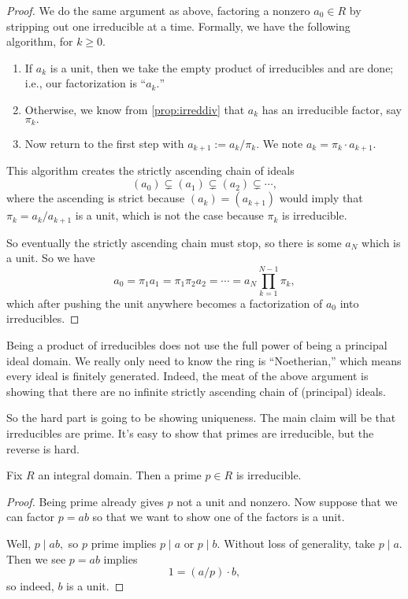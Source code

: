 \begin{proof}
    We do the same argument as above, factoring a nonzero $a_0\in R$ by stripping out one irreducible at a time. Formally, we have the following algorithm, for $k\ge0.$
    \begin{enumerate}
        \item If $a_k$ is a unit, then we take the empty product of irreducibles and are done; i.e., our factorization is ``$a_k.$''
        \item Otherwise, we know from \autoref{prop:irreddiv} that $a_k$ has an irreducible factor, say $\pi_k.$
        \item Now return to the first step with $a_{k+1}:=a_k/\pi_k.$ We note $a_k=\pi_k\cdot a_{k+1}.$
    \end{enumerate}
    This algorithm creates the strictly ascending chain of ideals
    \[(a_0)\subsetneq(a_1)\subsetneq(a_2)\subsetneq\cdots,\]
    where the ascending is strict because $(a_k)=(a_{k+1})$ would imply that $\pi_k=a_k/a_{k+1}$ is a unit, which is not the case because $\pi_k$ is irreducible.

    So eventually the strictly ascending chain must stop, so there is some $a_N$ which is a unit. So we have
    \[a_0=\pi_1a_1=\pi_1\pi_2a_2=\cdots=a_N\prod_{k=1}^{N-1}\pi_k,\]
    which after pushing the unit anywhere becomes a factorization of $a_0$ into irreducibles.
\end{proof}
\begin{remark}
    Being a product of irreducibles does not use the full power of being a principal ideal domain. We really only need to know the ring is ``Noetherian,'' which means every ideal is finitely generated. Indeed, the meat of the above argument is showing that there are no infinite strictly ascending chain of (principal) ideals.
\end{remark}
So the hard part is going to be showing uniqueness. The main claim will be that irreducibles are prime. It's easy to show that primes are irreducible, but the reverse is hard.
\begin{lemma}
    Fix $R$ an integral domain. Then a prime $p\in R$ is irreducible.
\end{lemma}
\begin{proof}
    Being prime already gives $p$ not a unit and nonzero. Now suppose that we can factor $p=ab$ so that we want to show one of the factors is a unit.

    Well, $p\mid ab,$ so $p$ prime implies $p\mid a$ or $p\mid b.$ Without loss of generality, take $p\mid a.$ Then we see $p=ab$ implies
    \[1=(a/p)\cdot b,\]
    so indeed, $b$ is a unit.
\end{proof}

